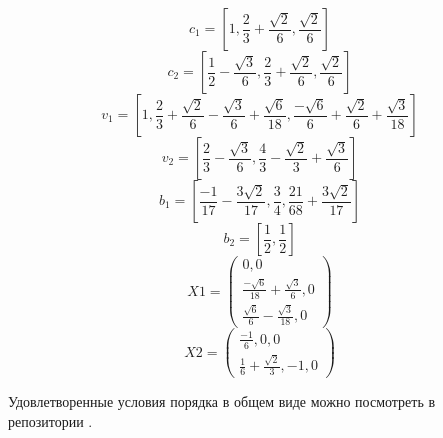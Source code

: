 \documentclass[a4paper,article,14pt]{extarticle}
\begin{document}
\begin{equation}
    c_{1} = \left[
    1, \frac{2}{3} + \frac{\sqrt{2}}{6}, \frac{\sqrt{2}}{6}
    \right]
\end{equation}
\begin{equation}
    c_{2} = \left[
    \frac{1}{2} - \frac{\sqrt{3}}{6}, \frac{2}{3} + \frac{\sqrt{2}}{6}, \frac{\sqrt{2}}{6}
    \right]
\end{equation}
\begin{equation}
    v_{1} = \left[
    1, \frac{2}{3} + \frac{\sqrt{2}}{6} - \frac{\sqrt{3}}{6} + \frac{\sqrt{6}}{18}, \frac{-\sqrt{6}}{6} + \frac{\sqrt{2}}{6} + \frac{\sqrt{3}}{18}
    \right]
\end{equation}
\begin{equation}
    v_{2} = \left[
    \frac{2}{3} - \frac{\sqrt{3}}{6}, \frac{4}{3} - \frac{\sqrt{2}}{3} + \frac{\sqrt{3}}{6}
    \right]
\end{equation}
\begin{equation}
    b_{1} = \left[
    \frac{-1}{17} - \frac{3\sqrt{2}}{17}, \frac{3}{4}, \frac{21}{68} + \frac{3\sqrt{2}}{17}
    \right]
\end{equation}
\begin{equation}
    b_{2} = \left[
    \frac{1}{2}, \frac{1}{2}
    \right]
\end{equation}
\begin{equation}
X1 = 
\begin{pmatrix}
    0, 0\\
    \frac{-\sqrt{6}}{18} + \frac{\sqrt{3}}{6}, 0\\
    \frac{\sqrt{6}}{6} - \frac{\sqrt{3}}{18}, 0
\end{pmatrix}
\end{equation}
\begin{equation}
X2 = 
\begin{pmatrix}
    \frac{-1}{6}, 0, 0\\
    \frac{1}{6} + \frac{\sqrt{2}}{3}, -1, 0
\end{pmatrix}
\end{equation}

Удовлетворенные условия порядка в общем виде можно посмотреть в репозитории \cite{code}.
\pagebreak
\end{document}
